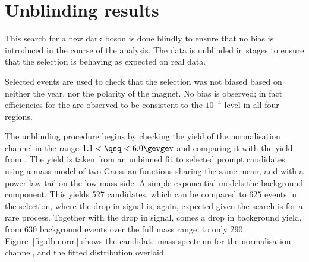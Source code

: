 \section{Unblinding results}

This search for a new dark boson is done blindly to ensure that no bias is introduced in the
course of the analysis.
The data is unblinded in stages to ensure that the selection is behaving as expected on real data.


Selected \decay{\Bd}{\jpsi\Kstarz} events are used to check that the selection was not biased
based on neither the year, nor the polarity of the \lhcb magnet.
No bias is observed; in fact
efficiencies for the \uBDT are observed to be consistent to the $10^{-4}$ level in all four regions.

The unblinding procedure begins by checking the yield of the normalisation channel
\btokstrmumu in the range $1.1<\qsq<6.0\gevgev$ and comparing it with the yield from
.
The yield is taken from an unbinned fit to selected prompt \btokstrdb candidates using a mass model
of two Gaussian functions sharing the same mean, and with a power-law tail on the low mass side.
A simple exponential models the background component.
This yields 527 \Bd candidates, which can be compared to \approx$625$ events in the \sm selection,
where the drop in signal is, again, expected given the search is for a rare process.
Together with the drop in signal, comes a drop in background yield, from \approx$630$ background
events over the full mass range, to only 290.
Figure~\ref{fig:db:norm} shows the \Bd candidate mass spectrum for the normalisation channel, and
the fitted distribution overlaid.

